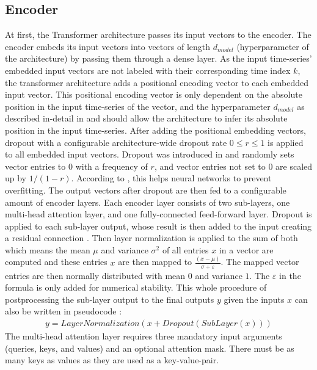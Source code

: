 \documentclass[draft,final]{vutinfth} %
\begin{document}
\subsection{Encoder} \label{encoder}
At first, the Transformer architecture passes its input vectors to the encoder.
The encoder embeds its input vectors into vectors of length $d_{model}$ (hyperparameter of the architecture) by passing them through a dense layer.
As the input time-series' embedded input vectors are not labeled with their corresponding time index $k$, the transformer architecture adds a positional encoding vector to each embedded input vector.
This positional encoding vector is only dependent on the absolute position in the input time-series of the vector, and the hyperparameter $d_{model}$ as described in-detail in \cite[p. 6]{Transformer} and should allow the architecture to infer its absolute position in the input time-series.
After adding the positional embedding vectors, dropout with a configurable architecture-wide dropout rate $0 \leq r \leq 1$ is applied to all embedded input vectors.
Dropout was introduced in \cite{dropout} and randomly sets vector entries to $0$ with a frequency of $r$, and vector entries not set to $0$ are scaled up by $1/(1-r)$.
According to \cite[p. 1]{dropout}, this helps neural networks to prevent overfitting.
The output vectors after dropout are then fed to a configurable amount of encoder layers.
Each encoder layer consists of two sub-layers, one multi-head attention layer, and one fully-connected feed-forward layer.
Dropout is applied to each sub-layer output, whose result is then added to the input creating a residual connection \cite{ResNet}.
Then layer normalization \cite{layer_norm} is applied to the sum of both which means the mean $\mu$ and variance $\sigma^2$ of all entries $x$ in a vector are computed and these entries $x$ are then mapped to $\frac{(x-\mu)}{\sigma + \varepsilon}$.
The mapped vector entries are then normally distributed with mean $0$ and variance $1$. The $\varepsilon$ in the formula is only added for numerical stability.
This whole procedure of postprocessing the sub-layer output to the final outputs $y$ given the inputs $x$ can also be written in pseudocode \cite[p. 3]{Transformer}:
\begin{align}
y = LayerNormalization(x + Dropout(SubLayer(x)))
\end{align}
The multi-head attention layer requires three mandatory input arguments (queries, keys, and values) and an optional attention mask.
There must be as many keys as values as they are used as a key-value-pair.
\end{document}
